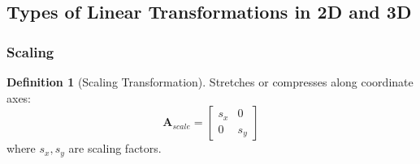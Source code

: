 \documentclass[12pt,a4paper]{article}
\theoremstyle{definition}
\newtheorem{definition}{Definition}[section]
\begin{document}
\subsection{Types of Linear Transformations in 2D and 3D}

\subsubsection{Scaling}

\begin{definition}[Scaling Transformation]
Stretches or compresses along coordinate axes:
\[
\mathbf{A}_{scale} = \begin{bmatrix}
s_x & 0 \\
0 & s_y
\end{bmatrix}
\]
where $s_x, s_y$ are scaling factors.
\end{definition}
\end{document}
